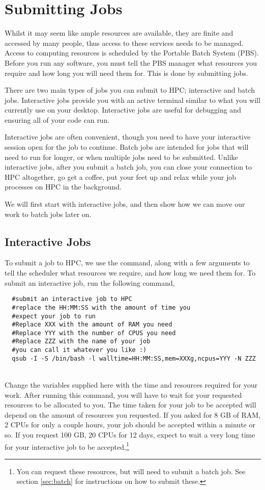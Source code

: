 \section{Submitting Jobs}
\label{ref:submitting}
% 
% 
%
Whilst it may seem like ample resources are available, they are finite and accessed by many people, thus access to these services needs to be managed. Access to computing resources is scheduled by the Portable Batch System (PBS). Before you run any software, you must tell the PBS manager what resources you require and how long you will need them for. This is done by submitting jobs.
%
%
\par
%
%
There are two main types of jobs you can submit to HPC; interactive and batch jobs. Interactive jobs provide you with an active terminal similar to what you will currently use on your desktop. Interactive jobs are useful for debugging and ensuring all of your code can run.
%
%
\par
%
%
Interactive jobs are often convenient, though you need to have your interactive session open for the job to continue. Batch jobs are intended for jobs that will need to run for longer, or when multiple jobs need to be submitted. Unlike interactive jobs, after you submit a batch job, you can close your connection to HPC altogether, go get a coffee, put your feet up and relax while your job processes on HPC in the background.
%
%
%
\par
We will first start with interactive jobs, and then show how we can move our work to batch jobs later on.
%
%
%
\subsection{Interactive Jobs}
To submit a job to HPC, we use the  command, along with a few arguments to tell the scheduler what resources we require, and how long we need them for. To submit an interactive job, run the following command,
%
%
\\
\par
\begin{verbatim}
  #submit an interactive job to HPC
  #replace the HH:MM:SS with the amount of time you
  #expect your job to run
  #Replace XXX with the amount of RAM you need
  #Replace YYY with the number of CPUS you need
  #Replace ZZZ with the name of your job
  #you can call it whatever you like :)
  qsub -I -S /bin/bash -l walltime=HH:MM:SS,mem=XXXg,ncpus=YYY -N ZZZ
\end{verbatim}
%
\\
% 
Change the variables supplied here with the time and resources required for your work. After running this command, you will have to wait for your requested resources to be allocated to you. The time taken for your job to be accepted will depend on the amount of resources you requested. If you asked for 8 GB of RAM, 2 CPUs for only a couple hours, your job should be accepted within a minute or so. If you request 100 GB, 20 CPUs for 12 days, expect to wait a very long time for your interactive job to be accepted.\footnote{You can request these resources, but will need to submit a batch job. See section \ref{sec:batch} for instructions on how to submit these.}

